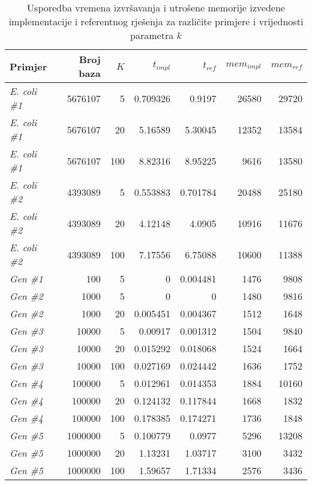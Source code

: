 \documentclass[times, utf8, seminar, numeric]{fer}
\begin{document}
\begin{table}[h]
	\centering
	\caption{Usporedba vremena izvršavanja i utrošene memorije izvedene implementacije i referentnog rješenja za različite primjere i vrijednosti parametra $k$}
	\label{tbl:results}
	
	\begin{tabular}{lrrrrrr}
		\hline
    Primjer & Broj baza & $K$ & $t_{impl}$ & $t_{ref}$ & $mem_{impl}$ & $mem_{ref}$ \\ \hline
    \textit{E. coli \#1} & 5676107 & 5 & 0.709326 & 0.9197 & 26580 & 29720 \\
    \textit{E. coli \#1} & 5676107 & 20 & 5.16589 & 5.30045 & 12352 & 13584 \\
    \textit{E. coli \#1} & 5676107 & 100 & 8.82316 & 8.95225 & 9616 & 13580 \\
    \textit{E. coli \#2} & 4393089 & 5 & 0.553883 & 0.701784 & 20488 & 25180 \\
    \textit{E. coli \#2} & 4393089 & 20 & 4.12148 & 4.0905 & 10916 & 11676 \\
    \textit{E. coli \#2} & 4393089 & 100 & 7.17556 & 6.75088 & 10600 & 11388 \\
    \textit{Gen \#1} & 100 & 5 & 0 & 0.004481 & 1476 & 9808 \\
    \textit{Gen \#2} & 1000 & 5 & 0 & 0 & 1480 & 9816 \\
    \textit{Gen \#2} & 1000 & 20 & 0.005451 & 0.004367 & 1512 & 1648 \\
    \textit{Gen \#3} & 10000 & 5 & 0.00917 & 0.001312 & 1504 & 9840 \\
    \textit{Gen \#3} & 10000 & 20 & 0.015292 & 0.018068 & 1524 & 1664 \\
    \textit{Gen \#3} & 10000 & 100 & 0.027169 & 0.024442 & 1636 & 1752 \\
    \textit{Gen \#4} & 100000 & 5 & 0.012961 & 0.014353 & 1884 & 10160 \\
    \textit{Gen \#4} & 100000 & 20 & 0.124132 & 0.117844 & 1668 & 1832 \\
    \textit{Gen \#4} & 100000 & 100 & 0.178385 & 0.174271 & 1736 & 1848 \\
    \textit{Gen \#5} & 1000000 & 5 & 0.100779 & 0.0977 & 5296 & 13208 \\
    \textit{Gen \#5} & 1000000 & 20 & 1.13231 & 1.03717 & 3100 & 3432 \\
    \textit{Gen \#5} & 1000000 & 100 & 1.59657 & 1.71334 & 2576 & 3436 \\
    \hline
	\end{tabular}
\end{table}
\end{document}
